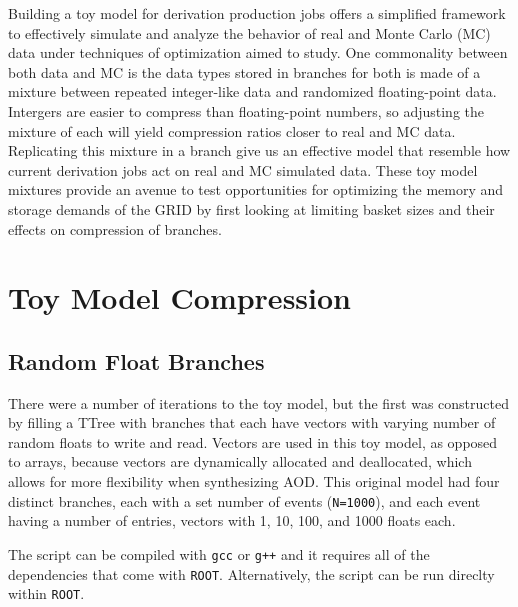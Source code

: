 Building a toy model for derivation production jobs offers a simplified framework to effectively simulate and analyze the behavior of real and Monte Carlo (MC) data under techniques of optimization aimed to study.
One commonality between both data and MC is the data types stored in branches for both is made of a mixture between repeated integer-like data and randomized floating-point data. 
Intergers are easier to compress than floating-point numbers, so adjusting the mixture of each will yield compression ratios closer to real and MC data.  
Replicating this mixture in a branch give us an effective model that resemble how current derivation jobs act on real and MC simulated data. 
These toy model mixtures provide an avenue to test opportunities for optimizing the memory and storage demands of the GRID by first looking at limiting basket sizes and their effects on compression of branches. 


\section{Toy Model Compression}

\subsection{Random Float Branches} \label{sec:toy_compression_random_float_branches}
There were a number of iterations to the toy model, but the first was constructed by filling a TTree with branches that each have vectors with varying number of random floats to write and read.
Vectors are used in this toy model, as opposed to arrays, because vectors are dynamically allocated and deallocated, which allows for more flexibility when synthesizing AOD. 
This original model had four distinct branches, each with a set number of events (\verb|N=1000|), and each event having a number of entries, vectors with 1, 10, 100, and 1000 floats each.

The script can be compiled with \verb|gcc| or \verb|g++| and it requires all of the dependencies that come with \verb|ROOT|. 
Alternatively, the script can be run direclty within \verb|ROOT|.
  
